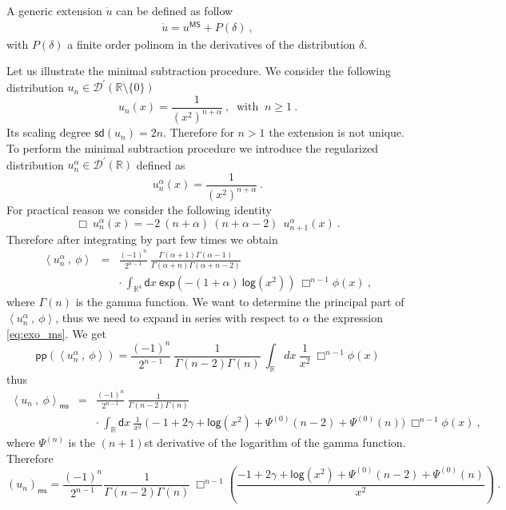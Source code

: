 \documentclass[11pt]{book}
\newcommand{\pp}{\mathsf{pp}}
\newcommand{\ms}{\mathsf{ms}}
\newcommand{\sd}{\mathsf{sd}}
\renewcommand{\exp}{\mathsf{exp}}
\renewcommand{\log}{\mathsf{log}}
\newcommand{\sm}[1]{\left\langle#1\right\rangle}
\newcommand{\Dcal}{\mathcal{D}}
\newcommand{\Rbb}{\mathbb{R}}
\newcommand{\dsf}{\mathsf{d}}
\theoremstyle{break}
\begin{document}
A generic extension $\dot{u}$ can be defined as follow
% 
\begin{eqnarray*}
\dot{u} = u^{\mathsf{MS}} + P(\delta) \ ,
\end{eqnarray*}
%
with $P(\delta)$ a finite order polinom in the derivatives of the distribution $\delta$.

\bigskip

Let us illustrate the minimal subtraction procedure. We consider the following distribution $u_n \in \Dcal^\prime(\Rbb\setminus\{0\})$
%
\begin{equation*}
u_n(x) = \frac{1}{(x^2)^{n+\alpha}} \ , \ \mbox{ with } \ n \geq 1 \ . 
\end{equation*}
%
Its scaling degree $\sd(u_n)=2n$. Therefore for $n>1$ the extension is not unique. To perform the minimal subtraction procedure we introduce the regularized distribution $u^\alpha_n \in \Dcal^\prime(\Rbb)$ defined as
%
\begin{equation*}
u^\alpha_n(x) = \frac{1}{(x^2)^{n+\alpha}} \ .
\end{equation*}
%
For practical reason we consider the following identity
%
\begin{equation*}
\Box \ u^\alpha_n(x) = - 2 \ (n+\alpha) \ (n+\alpha-2) \ \ u^\alpha_{n+1}(x)  \ .
\end{equation*}
%
Therefore after integrating by part few times we obtain
%
\begin{eqnarray}
\sm{u^\alpha_n \ , \ \phi} &=& \frac{(-1)^{n}}{2^{n-1}} \ \frac{\Gamma(\alpha+1)\Gamma(\alpha-1)}{\Gamma(\alpha+n)\Gamma(\alpha+n-2)} \nonumber \\
&& \cdot \ \int_{\Rbb^4} \dsf x \ \exp\left(-(1+\alpha) \ \log\left(x^2\right)\right) \ \Box^{n-1}\phi(x) \ , 
\label{eq:exo_ms}
\end{eqnarray}
%
where $\Gamma(n)$ is the gamma function. We want to determine the principal part of $\sm{u^\alpha_n \ , \ \phi}$, thus we need to expand in series with respect to $\alpha$ the expression \eqref{eq:exo_ms}. We get
%
\begin{equation*}
\pp\left(\sm{u^\alpha_n \ , \ \phi}\right) = \frac{(-1)^{n}}{2^{n-1}} \ \frac{1}{\Gamma(n-2)\Gamma(n)} \ \int_{\Rbb} dx \ \frac{1}{x^2} \ \Box^{n-1}\phi(x) 
\end{equation*}
%
thus
%
\begin{eqnarray*}
\sm{u_n \ , \ \phi}_\ms &=& \frac{(-1)^{n}}{2^{n-1}} \ \frac{1}{\Gamma(n-2)\Gamma(n)} \\
&& \cdot \ \int_{\Rbb} \dsf x \ \frac{1}{x^2} \ \bigg( -1 + 2 \gamma + \log(x^2) + \Psi^{(0)}(n-2) + \Psi^{(0)}(n) \bigg) \ \Box^{n-1} \phi(x) \ ,
\end{eqnarray*}
%
where $\Psi^{(n)}$ is the $(n+1)$st derivative of the logarithm of the gamma function. Therefore
%
\begin{equation*}
\left(u_n\right)_\ms = \frac{(-1)^{n}}{2^{n-1}} \frac{1}{\Gamma(n-2)\Gamma(n)} \ \Box^{n-1} \left( \frac{-1 + 2 \gamma + \log(x^2) + \Psi^{(0)}(n-2) + \Psi^{(0)}(n)}{x^2} \right) \ .
\end{equation*}
%
\end{document}
